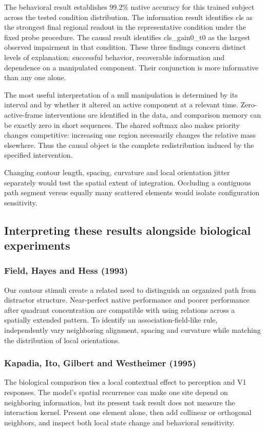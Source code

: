 \documentclass[11pt]{article}
\begin{document}
The behavioral result establishes 99.2\% native accuracy for this trained subject across the tested condition distribution. The information result identifies cls as the strongest final regional readout in the representative condition under the fixed probe procedure. The causal result identifies cls\_\allowbreak{}gain0\_\allowbreak{}t0 as the largest observed impairment in that condition. These three findings concern distinct levels of explanation: successful behavior, recoverable information and dependence on a manipulated component. Their conjunction is more informative than any one alone.

The most useful interpretation of a null manipulation is determined by its interval and by whether it altered an active component at a relevant time. Zero-active-frame interventions are identified in the data, and comparison memory can be exactly zero in short sequences. The shared softmax also makes priority changes competitive: increasing one region necessarily changes the relative mass elsewhere. Thus the causal object is the complete redistribution induced by the specified intervention.

Changing contour length, spacing, curvature and local orientation jitter separately would test the spatial extent of integration. Occluding a contiguous path segment versus equally many scattered elements would isolate configuration sensitivity.

\subsection{Interpreting these results alongside biological experiments}
\subsubsection{Field, Hayes and Hess (1993)}
Our contour stimuli create a related need to distinguish an organized path from distractor structure. Near-perfect native performance and poorer performance after quadrant concentration are compatible with using relations across a spatially extended pattern. To identify an association-field-like rule, independently vary neighboring alignment, spacing and curvature while matching the distribution of local orientations. \cite{bio_field}

\subsubsection{Kapadia, Ito, Gilbert and Westheimer (1995)}
The biological comparison ties a local contextual effect to perception and V1 responses. The model’s spatial recurrence can make one site depend on neighboring information, but its present task result does not measure the interaction kernel. Present one element alone, then add collinear or orthogonal neighbors, and inspect both local state change and behavioral sensitivity. \cite{bio_kapadia}
\end{document}
